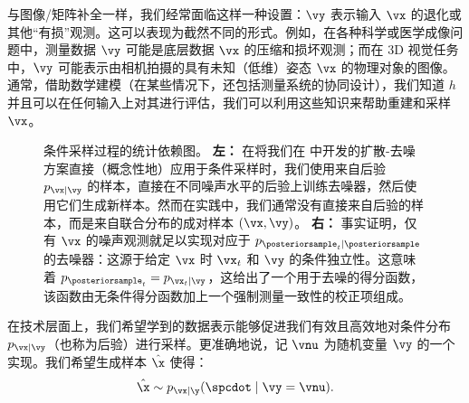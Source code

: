 \documentclass[../../book-main_zh.tex]{subfiles}
\begin{document}
与图像/矩阵补全一样，我们经常面临这样一种设置：$\vy$ 表示输入 $\vx$ 的退化或其他“有损”观测。这可以表现为截然不同的形式。例如，在各种科学或医学成像问题中，测量数据 $\vy$ 可能是底层数据 $\vx$ 的压缩和损坏观测；而在 3D 视觉任务中，$\vy$ 可能表示由相机拍摄的具有未知（低维）姿态 $\vx$ 的物理对象的图像。通常，借助数学建模（在某些情况下，还包括测量系统的协同设计），我们知道 $h$ 并且可以在任何输入上对其进行评估，我们可以利用这些知识来帮助重建和采样 $\vx$。

\begin{figure}[t]
    \centering
    \begin{subfigure}{0.45\textwidth}
        \vspace{0.75cm}
        \centering
        \vspace{0.75cm}
        \caption{}
        \label{fig:left}
    \end{subfigure}
    \hfill
    \begin{subfigure}{0.45\textwidth}
        \centering
        \caption{}
        \label{fig:right}
    \end{subfigure}
    \caption{条件采样过程的统计依赖图。
        \textbf{左：} 在将我们在  中开发的扩散-去噪方案直接（概念性地）应用于条件采样时，我们使用来自后验 $p_{\vx \mid \vy}$ 的样本，直接在不同噪声水平的后验上训练去噪器，然后使用它们生成新样本。然而在实践中，我们通常没有直接来自后验的样本，而是来自联合分布的成对样本 $(\vx, \vy)$。
        \textbf{右：} 事实证明，仅有 $\vx$ 的噪声观测就足以实现对应于 $p_{\posteriorsample_t \mid \posteriorsample}$ 的去噪器：这源于给定 $\vx$ 时 $\vx_t$ 和 $\vy$ 的条件独立性。这意味着 $p_{\posteriorsample_t} =
        p_{\vx_t \mid
        \vy}$，这给出了一个用于去噪的得分函数，该函数由无条件得分函数加上一个强制测量一致性的校正项组成。}
    \label{fig:posterior-sampling-cds}
\end{figure}

在技术层面上，我们希望学到的数据表示能够促进我们有效且高效地对条件分布 $p_{\vx\mid
\vy}$（也称为后验）进行采样。更准确地说，记 $\vnu$ 为随机变量 $\vy$ 的一个实现。我们希望生成样本 $\hat{\x}$ 使得：
\begin{equation}\label{eq:goal-sample-posterior}
    \hat{\x} \sim   p_{\vx \mid \y}(\spcdot \mid \vy=\vnu).
\end{equation}
\end{document}
